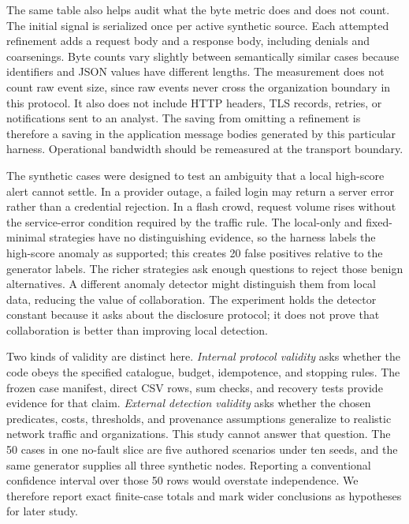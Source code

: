 \documentclass[conference,letterpaper]{IEEEtran}
\begin{document}
The same table also helps audit what the byte metric does and does not count. The initial signal is serialized once per active synthetic source. Each attempted refinement adds a request body and a response body, including denials and coarsenings. Byte counts vary slightly between semantically similar cases because identifiers and JSON values have different lengths. The measurement does not count raw event size, since raw events never cross the organization boundary in this protocol. It also does not include HTTP headers, TLS records, retries, or notifications sent to an analyst. The saving from omitting a refinement is therefore a saving in the application message bodies generated by this particular harness. Operational bandwidth should be remeasured at the transport boundary.

The synthetic cases were designed to test an ambiguity that a local high-score alert cannot settle. In a provider outage, a failed login may return a server error rather than a credential rejection. In a flash crowd, request volume rises without the service-error condition required by the traffic rule. The local-only and fixed-minimal strategies have no distinguishing evidence, so the harness labels the high-score anomaly as supported; this creates 20 false positives relative to the generator labels. The richer strategies ask enough questions to reject those benign alternatives. A different anomaly detector might distinguish them from local data, reducing the value of collaboration. The experiment holds the detector constant because it asks about the disclosure protocol; it does not prove that collaboration is better than improving local detection.

Two kinds of validity are distinct here. \emph{Internal protocol validity} asks whether the code obeys the specified catalogue, budget, idempotence, and stopping rules. The frozen case manifest, direct CSV rows, sum checks, and recovery tests provide evidence for that claim. \emph{External detection validity} asks whether the chosen predicates, costs, thresholds, and provenance assumptions generalize to realistic network traffic and organizations. This study cannot answer that question. The 50 cases in one no-fault slice are five authored scenarios under ten seeds, and the same generator supplies all three synthetic nodes. Reporting a conventional confidence interval over those 50 rows would overstate independence. We therefore report exact finite-case totals and mark wider conclusions as hypotheses for later study.
\end{document}
